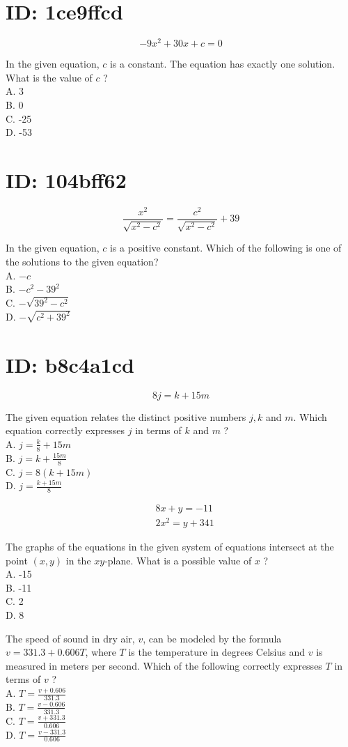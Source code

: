 \section*{ID: 1ce9ffcd}
$$
-9 x^{2}+30 x+c=0
$$

In the given equation, $c$ is a constant. The equation has exactly one solution. What is the value of $c$ ?\\
A. 3\\
B. 0\\
C. -25\\
D. -53

\section*{ID: 104bff62}
$$
\frac{x^{2}}{\sqrt{x^{2}-c^{2}}}=\frac{c^{2}}{\sqrt{x^{2}-c^{2}}}+39
$$

In the given equation, $c$ is a positive constant. Which of the following is one of the solutions to the given equation?\\
A. $-c$\\
B. $-c^{2}-39^{2}$\\
C. $-\sqrt{39^{2}-c^{2}}$\\
D. $-\sqrt{c^{2}+39^{2}}$

\section*{ID: b8c4a1cd}
$$
8 j=k+15 m
$$

The given equation relates the distinct positive numbers $j, k$ and $m$. Which equation correctly expresses $j$ in terms of $k$ and $m$ ?\\
A. $j=\frac{k}{8}+15 m$\\
B. $j=k+\frac{15 m}{8}$\\
C. $j=8(k+15 m)$\\
D. $j=\frac{k+15 m}{8}$

$$
\begin{aligned}
& 8 x+y=-11 \\
& 2 x^{2}=y+341
\end{aligned}
$$

The graphs of the equations in the given system of equations intersect at the point $(x, y)$ in the $x y$-plane. What is a possible value of $x$ ?\\
A. -15\\
B. -11\\
C. 2\\
D. 8

The speed of sound in dry air, $v$, can be modeled by the formula $v=331.3+0.606 T$, where $T$ is the temperature in degrees Celsius and $v$ is measured in meters per second. Which of the following correctly expresses $T$ in terms of $v$ ?\\
A. $T=\frac{v+0.606}{331.3}$\\
B. $T=\frac{v-0.606}{331.3}$\\
C. $T=\frac{v+331.3}{0.606}$\\
D. $T=\frac{v-331.3}{0.606}$


